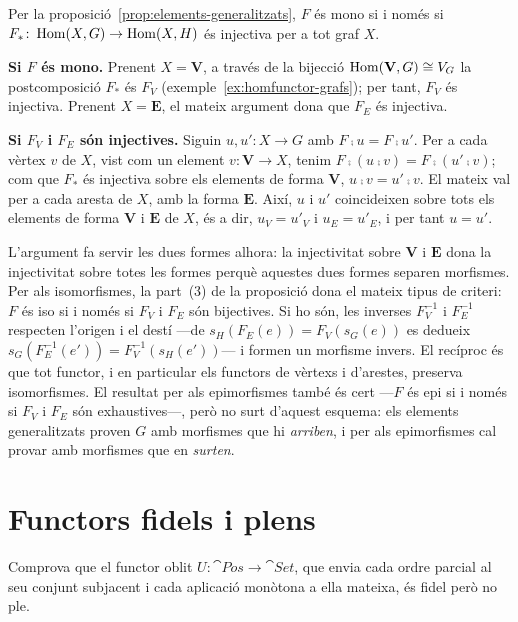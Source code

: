 \begin{solucio}
Per la proposició~\ref{prop:elements-generalitzats}, $F$ és mono si i només si $F_*\colon\operatorname{Hom}(X,G)\to\operatorname{Hom}(X,H)$ és injectiva per a tot graf $X$.

\textbf{Si $F$ és mono.} Prenent $X=\mathbf V$, a través de la bijecció $\operatorname{Hom}(\mathbf V,G)\cong V_G$ la postcomposició $F_*$ és $F_V$ (exemple~\ref{ex:homfunctor-grafs}); per tant, $F_V$ és injectiva. Prenent $X=\mathbf E$, el mateix argument dona que $F_E$ és injectiva.

\textbf{Si $F_V$ i $F_E$ són injectives.} Siguin $u,u'\colon X\to G$ amb $F\comp u=F\comp u'$. Per a cada vèrtex $v$ de $X$, vist com un element $v\colon\mathbf V\to X$, tenim $F\comp(u\comp v)=F\comp(u'\comp v)$; com que $F_*$ és injectiva sobre els elements de forma $\mathbf V$, $u\comp v=u'\comp v$. El mateix val per a cada aresta de $X$, amb la forma $\mathbf E$. Així, $u$ i $u'$ coincideixen sobre tots els elements de forma $\mathbf V$ i $\mathbf E$ de $X$, és a dir, $u_V=u'_V$ i $u_E=u'_E$, i per tant $u=u'$.

L'argument fa servir les dues formes alhora: la injectivitat sobre $\mathbf V$ i $\mathbf E$ dona la injectivitat sobre totes les formes perquè aquestes dues formes separen morfismes. Per als isomorfismes, la part~(3) de la proposició dona el mateix tipus de criteri: $F$ és iso si i només si $F_V$ i $F_E$ són bijectives. Si ho són, les inverses $F_V^{-1}$ i $F_E^{-1}$ respecten l'origen i el destí ---de $s_H(F_E(e))=F_V(s_G(e))$ es dedueix $s_G(F_E^{-1}(e'))=F_V^{-1}(s_H(e'))$--- i formen un morfisme invers. El recíproc és que tot functor, i en particular els functors de vèrtexs i d'arestes, preserva isomorfismes. El resultat per als epimorfismes també és cert ---$F$ és epi si i només si $F_V$ i $F_E$ són exhaustives---, però no surt d'aquest esquema: els elements generalitzats proven $G$ amb morfismes que hi \emph{arriben}, i per als epimorfismes cal provar amb morfismes que en \emph{surten}.
\end{solucio}

\section{Functors fidels i plens}

\begin{exercici}
Comprova que el functor oblit $U\colon\cat{Pos}\to\cat{Set}$, que envia cada ordre parcial al seu conjunt subjacent i cada aplicació monòtona a ella mateixa, és fidel però no ple.
\end{exercici}


